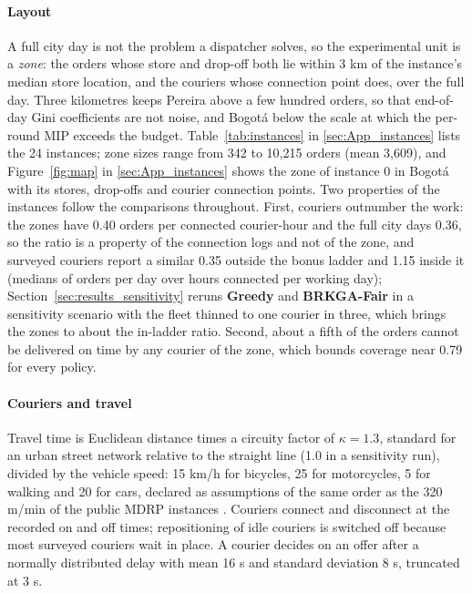 \documentclass[a4paper,11pt,review,3p,authoryear]{elsarticle}
\begin{document}
\paragraph{Layout} A full city day is not the problem a dispatcher solves, so the experimental unit is a \emph{zone}: the orders whose store and drop-off both lie within 3 km of the instance's median store location, and the couriers whose connection point does, over the full day. Three kilometres keeps Pereira above a few hundred orders, so that end-of-day Gini coefficients are not noise, and Bogot\'a below the scale at which the per-round MIP exceeds the budget. Table~\ref{tab:instances} in \ref{sec:App_instances} lists the 24 instances; zone sizes range from 342 to 10{,}215 orders (mean 3{,}609), and Figure~\ref{fig:map} in \ref{sec:App_instances} shows the zone of instance 0 in Bogot\'a with its stores, drop-offs and courier connection points. Two properties of the instances follow the comparisons throughout. First, couriers outnumber the work: the zones have 0.40 orders per connected courier-hour and the full city days 0.36, so the ratio is a property of the connection logs and not of the zone, and surveyed couriers report a similar 0.35 outside the bonus ladder and 1.15 inside it (medians of orders per day over hours connected per working day); Section~\ref{sec:results_sensitivity} reruns \textbf{Greedy} and \textbf{BRKGA-Fair} in a sensitivity scenario with the fleet thinned to one courier in three, which brings the zones to about the in-ladder ratio. Second, about a fifth of the orders cannot be delivered on time by any courier of the zone, which bounds coverage near 0.79 for every policy.

\paragraph{Couriers and travel} Travel time is Euclidean distance times a circuity factor of $\kappa = 1.3$, standard for an urban street network relative to the straight line (1.0 in a sensitivity run), divided by the vehicle speed: 15 km/h for bicycles, 25 for motorcycles, 5 for walking and 20 for cars, declared as assumptions of the same order as the 320 m/min of the public MDRP instances \citep{reyes2018meal}. Couriers connect and disconnect at the recorded on and off times; repositioning of idle couriers is switched off because most surveyed couriers wait in place. A courier decides on an offer after a normally distributed delay with mean 16 s and standard deviation 8 s, truncated at 3 s.
\end{document}
